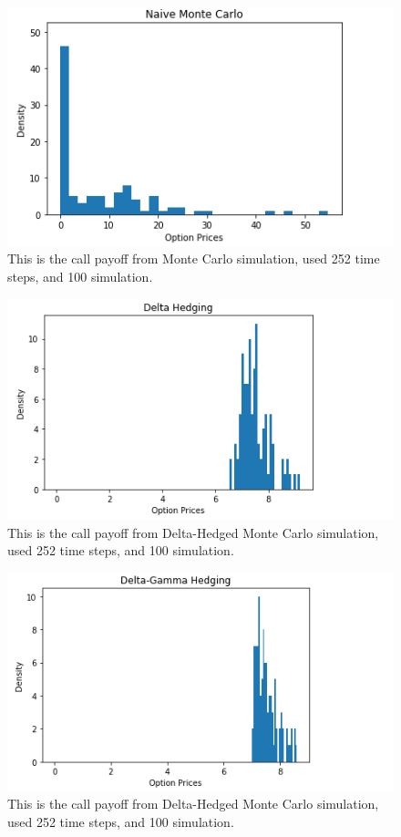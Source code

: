 \documentclass[11pt,]{article}
\makeatletter
\def\maxwidth{\ifdim\Gin@nat@width>\linewidth\linewidth
\else\Gin@nat@width\fi}
\let\Oldincludegraphics\includegraphics
\renewcommand{\includegraphics}[1]{\Oldincludegraphics[width=\maxwidth]{#1}}
\makeatother
\begin{document}
\begin{figure}
\centering
\includegraphics{images/Naive.PNG}
\caption{This is the call payoff from Monte Carlo simulation, used 252
time steps, and 100 simulation.}
\end{figure}

\begin{figure}
\centering
\includegraphics{images/DeltaHedging.PNG}
\caption{This is the call payoff from Delta-Hedged Monte Carlo
simulation, used 252 time steps, and 100 simulation.}
\end{figure}

\begin{figure}
\centering
\includegraphics{images/DeltaGammaHedging.PNG}
\caption{This is the call payoff from Delta-Hedged Monte Carlo
simulation, used 252 time steps, and 100 simulation.}
\end{figure}
\end{document}
